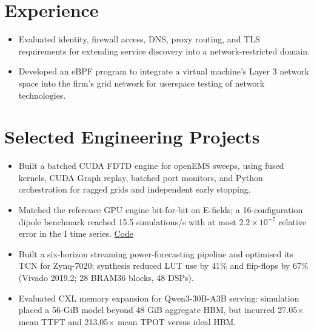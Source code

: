 \documentclass[a4paper, 11pt]{article}
\begin{document}
\section{Experience}
\resumeSubHeadingListStart
{}
\begin{itemize}
    \item Evaluated identity, firewall access, DNS, proxy routing, and TLS requirements for extending service discovery into a network-restricted domain.
    \item Developed an eBPF program to integrate a virtual machine's Layer 3 network space into the firm's grid network for userspace testing of network technologies.
\end{itemize}
\resumeSubHeadingListEnd

\section{Selected Engineering Projects}
\resumeSubHeadingListStart
{}
\begin{samepage}
\begin{itemize}
    \item Built a batched CUDA FDTD engine for openEMS sweeps, using fused kernels, CUDA Graph replay, batched port monitors, and Python orchestration for ragged grids and independent early stopping.
    \item Matched the reference GPU engine bit-for-bit on E-fields; a 16-configuration dipole benchmark reached 15.5 simulations/s with at most $2.2\times10^{-7}$ relative error in the I time series. \href{https://github.com/ProAltro/openems-cuda}{Code}
\end{itemize}
\end{samepage}

\begin{samepage}
\begin{itemize}
    \item Built a six-horizon streaming power-forecasting pipeline and optimised its TCN for Zynq-7020; synthesis reduced LUT use by 41\% and flip-flops by 67\% (Vivado 2019.2; 28 BRAM36 blocks, 48 DSPs).
    \item Evaluated CXL memory expansion for Qwen3-30B-A3B serving: simulation placed a 56-GiB model beyond 48 GiB aggregate HBM, but incurred 27.05$\times$ mean TTFT and 213.05$\times$ mean TPOT versus ideal HBM.
\end{itemize}
\end{samepage}
\end{document}
